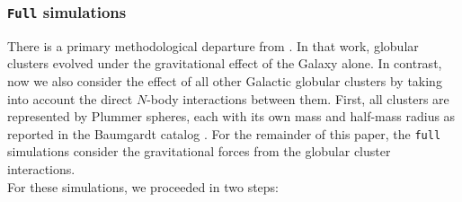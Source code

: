 \documentclass{aa}
\begin{document}
    \subsubsection{ \texttt{Full} simulations}
    There is a primary methodological departure from \citet{2023A&A...673A..44F}.  In that work, globular clusters evolved under the gravitational effect of the Galaxy alone. In contrast, now we also consider the effect of all other Galactic globular clusters by taking into account the direct $N$-body interactions between them. First, all clusters are represented by Plummer spheres, each with its own mass and half-mass radius as reported in the Baumgardt catalog \citep{2021MNRAS.505.5957B}. For the remainder of this paper, the \texttt{full} simulations consider the gravitational forces from the globular cluster interactions. \\
    For these simulations, we proceeded in two steps:
\end{document}

